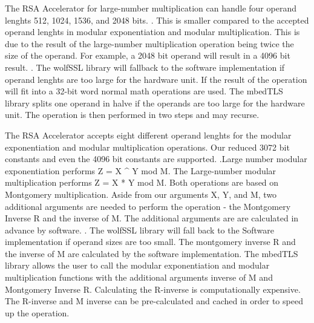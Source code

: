 The RSA Accelerator for large-number multiplication can handle four operand lenghts 512, 1024, 1536, and 2048 bits. \cite[598]{esp32-ref}. This is smaller compared to the accepted operand lenghts in modular exponentiation and modular multiplication. This is due to the result of the large-number multiplication operation being twice the size of the operand. For example, a 2048 bit operand will result in a 4096 bit result. \cite[598-599]{esp32-ref}. The wolfSSL library will fallback to the software implementation if operand lenghts are too large for the hardware unit. If the result of the operation will fit into a 32-bit word normal math operations are used. The mbedTLS library splits one operand in halve if the operands are too large for the hardware unit. The operation is then performed in two steps and may recurse.


The RSA Accelerator accepts eight different operand lenghts for the modular exponentiation and modular multiplication operations. Our reduced 3072 bit constants and even the 4096 bit constants are supported. \cite[598]{esp32-ref}.Large number modular exponentiation performs Z = X ^ Y mod M. The Large-number modular multiplication performs Z = X * Y mod M. Both operations are based on Montgomery multiplication. Aside from our arguments X, Y, and M, two additional arguments are needed to perform the operation - the Montgomery Inverse R and the inverse of M. The additional arguments are are calculated in advance by software. \cite[598-599]{esp32-ref}. The wolfSSL library will fall back to the Software implementation if operand sizes are too small. The montgomery inverse R and the inverse of M are calculated by the software implementation. The mbedTLS library allows the user to call the modular exponentiation and modular multiplication functions with the additional arguments inverse of M and Montgomery Inverse R. Calculating the R-inverse is computationally expensive. The R-inverse and M inverse can be pre-calculated and cached in order to speed up the operation. 

